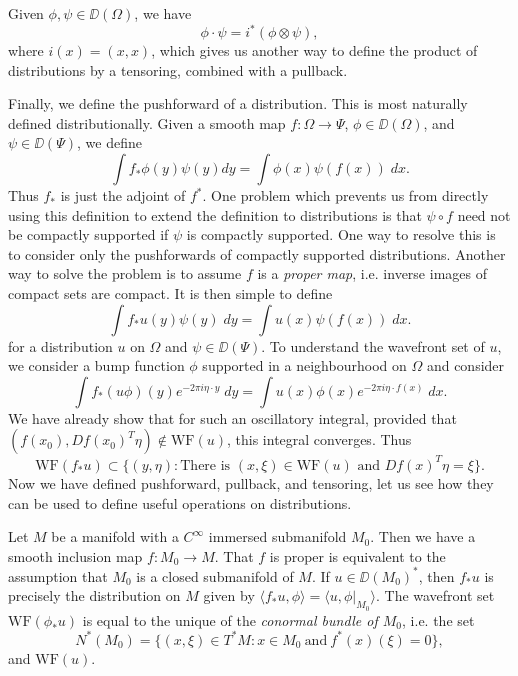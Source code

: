 \begin{example}
    Given $\phi,\psi \in \DD(\Omega)$, we have
    \[ \phi \cdot \psi = i^*(\phi \otimes \psi), \]
    where $i(x) = (x,x)$, which gives us another way to define the product of distributions by a tensoring, combined with a pullback.
\end{example}

Finally, we define the pushforward of a distribution. This is most naturally defined distributionally. Given a smooth map $f: \Omega \to \Psi$, $\phi \in \DD(\Omega)$, and $\psi \in \DD(\Psi)$, we define
%
\[ \int f_* \phi(y) \psi(y) dy = \int \phi(x) \psi(f(x))\; dx. \]
%
Thus $f_*$ is just the adjoint of $f^*$. One problem which prevents us from directly using this definition to extend the definition to distributions is that $\psi \circ f$ need not be compactly supported if $\psi$ is compactly supported. One way to resolve this is to consider only the pushforwards of compactly supported distributions. Another way to solve the problem is to assume $f$ is a \emph{proper map}, i.e. inverse images of compact sets are compact. It is then simple to define
%
\[ \int f_* u(y) \psi(y)\; dy = \int u(x) \psi(f(x))\; dx. \]
%
for a distribution $u$ on $\Omega$ and $\psi \in \DD(\Psi)$. To understand the wavefront set of $u$, we consider a bump function $\phi$ supported in a neighbourhood  on $\Omega$ and consider
%
\[ \int f_*(u \phi)(y) e^{-2 \pi i \eta \cdot y}\; dy = \int u(x) \phi(x) e^{-2 \pi i \eta \cdot f(x)}\; dx. \]
%
We have already show that for such an oscillatory integral, provided that $(f(x_0),Df(x_0)^T \eta) \not \in \text{WF}(u)$, this integral converges. Thus
%
\[ \text{WF}(f_* u) \subset \{ (y,\eta) : \text{There is $(x,\xi) \in \text{WF}(u)$ and $Df(x)^T \eta = \xi$} \}. \]
%
Now we have defined pushforward, pullback, and tensoring, let us see how they can be used to define useful operations on distributions.

\begin{example}
    Let $M$ be a manifold with a $C^\infty$ immersed submanifold $M_0$. Then we have a smooth inclusion map $f: M_0 \to M$. That $f$ is proper is equivalent to the assumption that $M_0$ is a closed submanifold of $M$. If $u \in \DD(M_0)^*$, then $f_* u$ is precisely the distribution on $M$ given by $\langle f_* u, \phi \rangle = \langle u, \phi|_{M_0} \rangle$. The wavefront set $\text{WF}(\phi_* u)$ is equal to the unique of the \emph{conormal bundle of $M_0$}, i.e. the set
    \[ N^*(M_0) = \{ (x,\xi) \in T^*M: x \in M_0\ \text{and}\ f^*(x)(\xi) = 0 \}, \]
    and $\text{WF}(u)$.
\end{example}

